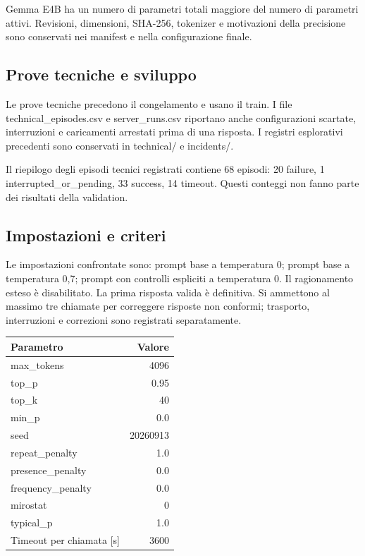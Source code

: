 Gemma E4B ha un numero di parametri totali maggiore del numero di parametri attivi. Revisioni, dimensioni, SHA-256, tokenizer e motivazioni della precisione sono conservati nei manifest e nella configurazione finale.

\subsection{Prove tecniche e sviluppo}

Le prove tecniche precedono il congelamento e usano il train. I file technical\_episodes.csv e server\_runs.csv riportano anche configurazioni scartate, interruzioni e caricamenti arrestati prima di una risposta. I registri esplorativi precedenti sono conservati in technical/ e incidents/.

Il riepilogo degli episodi tecnici registrati contiene 68 episodi: 20 failure, 1 interrupted\_or\_pending, 33 success, 14 timeout. Questi conteggi non fanno parte dei risultati della validation.

\subsection{Impostazioni e criteri}

Le impostazioni confrontate sono: prompt base a temperatura 0; prompt base a temperatura 0,7; prompt con controlli espliciti a temperatura 0. Il ragionamento esteso è disabilitato. La prima risposta valida è definitiva. Si ammettono al massimo tre chiamate per correggere risposte non conformi; trasporto, interruzioni e correzioni sono registrati separatamente.

\begin{center}\begin{tabular}{lr}\toprule Parametro & Valore\\\midrule

max\_tokens & 4096\\

top\_p & 0.95\\

top\_k & 40\\

min\_p & 0.0\\

seed & 20260913\\

repeat\_penalty & 1.0\\

presence\_penalty & 0.0\\

frequency\_penalty & 0.0\\

mirostat & 0\\

typical\_p & 1.0\\

Timeout per chiamata [s] & 3600\\

\bottomrule\end{tabular}\end{center}

